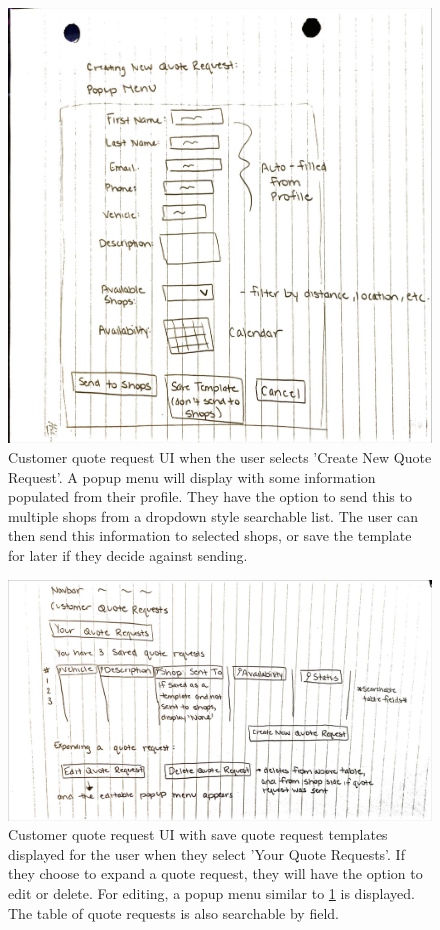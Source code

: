 \documentclass[12pt, titlepage]{article}
\begin{document}
\begin{figure}[H]
    \centering
    \includegraphics[width=\textwidth]{Design/SystDesign/Quotes/QuoteRequest3.png}
    \caption{Customer quote request UI when the user selects 'Create New Quote Request'. A popup menu will display with some information populated from their profile. They have the option to send this to multiple shops from a dropdown style searchable list. The user can then send this information to selected shops, or save the template for later if they decide against sending.}
    \label{fig:quoteRequestUI3}
\end{figure}

\begin{figure}[H]
    \centering
    \includegraphics[width=\textwidth]{Design/SystDesign/Quotes/QuoteRequest4.png}
    \caption{Customer quote request UI with save quote request templates displayed for the user when they select 'Your Quote Requests'. If they choose to expand a quote request, they will have the option to edit or delete. For editing, a popup menu similar to \ref{fig:quoteRequestUI3} is displayed. The table of quote requests is also searchable by field.}
    \label{fig:quoteRequestUI4}
\end{figure}
\end{document}
